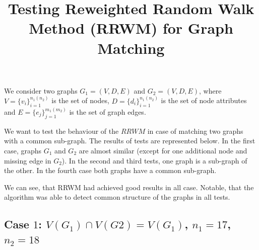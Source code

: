 \documentclass[
	fontsize=12pt,
	paper=a4,
	twoside=false,
	numbers=noenddot,
	plainheadsepline,
	toc=listof,
	toc=bibliography
]{scrartcl}
\title{Testing Reweighted Random Walk Method (RRWM) for Graph Matching }
\begin{document}
\maketitle

We consider two graphs $G_1=(V, D, E)$ and $G_2=(V, D, E)$, where $V = \{v_i\}_{i=1}^{n_1(n_2)}$ is the set of nodes, $D= \{d_i\}_{i=1}^{n_1(n_2)}$ is the set of node attributes and $E = \{e_{j}\}_{j=1}^{m_1(m_2)}$ is the set of graph edges.

We want to test the behaviour of the $RRWM$ in case of matching two graphs with a common sub-graph.
The results of tests are represented below.
In the first case, graphs $G_1$ and $G_2$ are almost similar (except for one additional node and missing edge in $G_2$). In the second and third tests, one graph is a sub-graph of the other. In the fourth case both graphs have a common sub-graph.

We can see, that RRWM had achieved good results in all case. Notable, that the algorithm was able to detect common structure of the graphs in all tests.
\newpage
\subsection*{ Case $1$: $V(G_1)\cap V(G2) = V(G_1)$, $n_1=17$, $n_2=18$}
\end{document}
